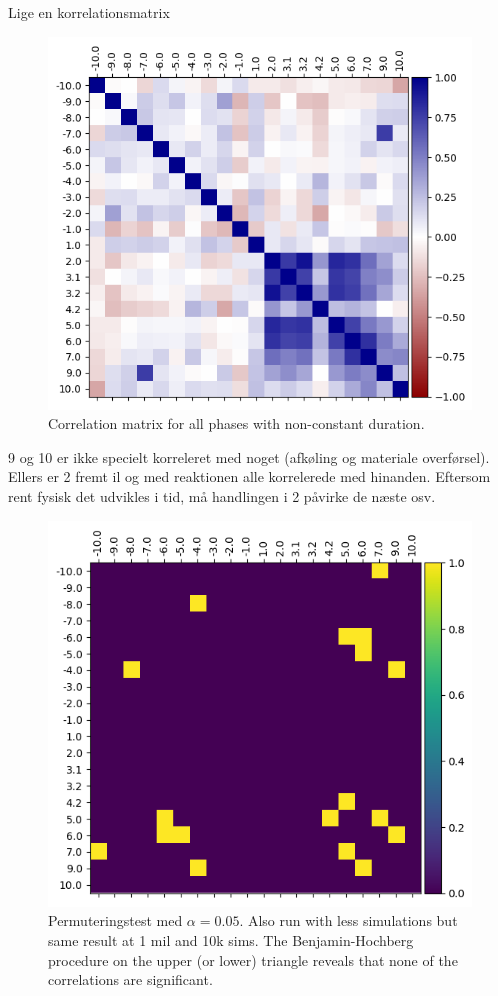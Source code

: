 \documentclass[../Thesis.tex]{subfiles}
\begin{document}
Lige en korrelationsmatrix
\begin{figure}[H]
    \centering
    \includegraphics[width=.9\linewidth]{figures/Multiple cycles data/Correlation matrix production and delays.png}
    \caption{Correlation matrix for all phases with non-constant duration.}
\end{figure}

9 og 10 er ikke specielt korreleret med noget (afkøling og materiale overførsel). Ellers er 2 fremt il og med reaktionen alle korrelerede med hinanden. Eftersom rent fysisk det udvikles i tid, må handlingen i 2 påvirke de næste osv.

\begin{figure}
    \centering
    \includegraphics[width=.9\linewidth]{figures/Multiple cycles data/Permutation test rho 10 mil.png}
    \caption{Permuteringstest med $\alpha = 0.05$. Also run with less simulations but same result at 1 mil and 10k sims. The Benjamin-Hochberg procedure on the upper (or lower) triangle reveals that none of the correlations are significant.}
\end{figure}
\end{document}
